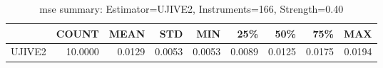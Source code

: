 \begin{table}[ht]
\centering
\caption{mse summary: Estimator=UJIVE2, Instruments=166, Strength=0.40}
\begin{tabular}{lrrrrrrrr}
\toprule
 & COUNT & MEAN & STD & MIN & 25\% & 50\% & 75\% & MAX \\
\midrule
UJIVE2 & 10.0000 & 0.0129 & 0.0053 & 0.0053 & 0.0089 & 0.0125 & 0.0175 & 0.0194 \\
\bottomrule
\end{tabular}
\end{table}
